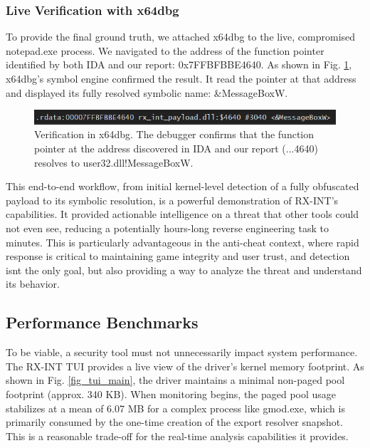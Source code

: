 \documentclass[journal]{IEEEtran}
\begin{document}
\subsubsection{Live Verification with x64dbg}
To provide the final ground truth, we attached x64dbg to the live, compromised notepad.exe process. We navigated to the address of the function pointer identified by both IDA and our report: 0x7FFBFBBE4640. As shown in Fig. \ref{fig_x64dbg}, x64dbg's symbol engine confirmed the result. It read the pointer at that address and displayed its fully resolved symbolic name: \&MessageBoxW.
\begin{figure}[!t]
\centering
\includegraphics[width=\columnwidth]{figures/x64dbg_resolve.png}
\caption{Verification in x64dbg. The debugger confirms that the function pointer at the address discovered in IDA and our report (...4640) resolves to user32.dll!MessageBoxW.}
\label{fig_x64dbg}
\end{figure}
This end-to-end workflow, from initial kernel-level detection of a fully obfuscated payload to its symbolic resolution, is a powerful demonstration of RX-INT's capabilities. It provided actionable intelligence on a threat that other tools could not even see, reducing a potentially hours-long reverse engineering task to minutes. This is particularly advantageous in the anti-cheat context, where rapid response is critical to maintaining game integrity and user trust, and detection isnt the only goal, but also providing a way to analyze the threat and understand its behavior.

\subsection{Performance Benchmarks}
To be viable, a security tool must not unnecessarily impact system performance. The RX-INT TUI provides a live view of the driver's kernel memory footprint. As shown in Fig. \ref{fig_tui_main}, the driver maintains a minimal non-paged pool footprint (approx. 340 KB). When monitoring begins, the paged pool usage stabilizes at a mean of 6.07 MB for a complex process like gmod.exe, which is primarily consumed by the one-time creation of the export resolver snapshot. This is a reasonable trade-off for the real-time analysis capabilities it provides.
\end{document}
